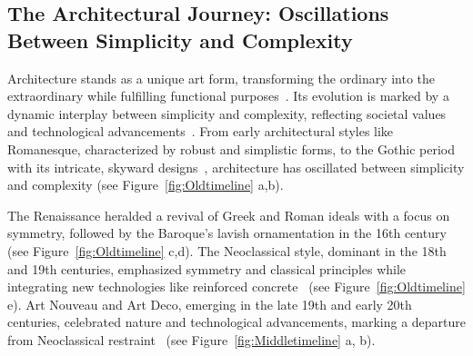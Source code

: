 



\subsection{The Architectural Journey: Oscillations Between Simplicity and Complexity}
\label{subsec:TimelineArchitectureStyles}

Architecture stands as a unique art form, transforming the ordinary into the extraordinary while fulfilling functional purposes~\cite{Hnin2022}.
Its evolution is marked by a dynamic interplay between simplicity and complexity, reflecting societal values and technological advancements~\cite{Economakis2023}.
From early architectural styles like Romanesque, characterized by robust and simplistic forms, to the Gothic period with its intricate, skyward designs~\cite{Stacbond2020}, architecture has oscillated between simplicity and complexity (see Figure~\ref{fig:Oldtimeline} a,b).

The Renaissance heralded a revival of Greek and Roman ideals with a focus on symmetry, followed by the Baroque's lavish ornamentation in the 16th century~\cite{Economakis2023} (see Figure~\ref{fig:Oldtimeline} c,d).
The Neoclassical style, dominant in the 18th and 19th centuries, emphasized symmetry and classical principles while integrating new technologies like reinforced concrete~\cite{Economakis2023} (see Figure~\ref{fig:Oldtimeline} e).
Art Nouveau and Art Deco, emerging in the late 19th and early 20th centuries, celebrated nature and technological advancements, marking a departure from Neoclassical restraint~\cite{Salas2018, Arora2023} (see Figure~\ref{fig:Middletimeline} a, b).

